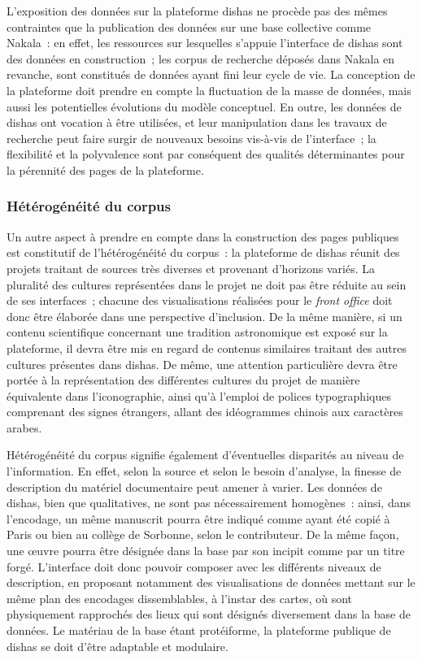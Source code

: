 \documentclass[a4paper,12pt,twoside]{book}
\newcommand{\eng}{\emph}
\newcommand{\bdd}{base de données\xspace}
\newcommand{\dishas}{\gls{dishas}\xspace}
\begin{document}
L'exposition des données sur la plateforme \dishas ne procède pas des mêmes contraintes que la publication des données sur une base collective comme Nakala~: en effet, les ressources sur lesquelles s'appuie l'interface de \dishas sont des données en construction~; les corpus de recherche déposés dans Nakala en revanche, sont constitués de données ayant fini leur cycle de vie. La conception de la plateforme doit prendre en compte la fluctuation de la masse de données, mais aussi les potentielles évolutions du modèle conceptuel. En outre, les données de \dishas ont vocation à être utilisées, et leur manipulation dans les travaux de recherche peut faire surgir de nouveaux besoins vis-à-vis de l'interface~; la flexibilité et la polyvalence sont par conséquent des qualités déterminantes pour la pérennité des pages de la plateforme.

			\subsubsection{Hétérogénéité du corpus}
Un autre aspect à prendre en compte dans la construction des pages publiques est constitutif de l'hétérogénéité du corpus~: la plateforme de \dishas réunit des projets traitant de sources très diverses et provenant d'horizons variés. La pluralité des cultures représentées dans le projet ne doit pas être réduite au sein de ses interfaces~; chacune des visualisations réalisées pour le \eng{front office} doit donc être élaborée dans une perspective d'inclusion. De la même manière, si un contenu scientifique concernant une tradition astronomique est exposé sur la plateforme, il devra être mis en regard de contenus similaires traitant des autres cultures présentes dans \dishas. De même, une attention particulière devra être portée à la représentation des différentes cultures du projet de manière équivalente dans l'iconographie, ainsi qu'à l'emploi de polices typographiques comprenant des signes étrangers, allant des idéogrammes chinois aux caractères arabes.

Hétérogénéité du corpus signifie également d'éventuelles disparités au niveau de l'information. En effet, selon la source et selon le besoin d'analyse, la finesse de description du matériel documentaire peut amener à varier. Les données de \dishas, bien que qualitatives, ne sont pas nécessairement homogènes~: ainsi, dans l'encodage, un même manuscrit pourra être indiqué comme ayant été copié à Paris ou bien au collège de Sorbonne, selon le contributeur. De la même façon, une œuvre pourra être désignée dans la base par son incipit comme par un titre forgé. L'interface doit donc pouvoir composer avec les différents niveaux de description, en proposant notamment des visualisations de données mettant sur le même plan des encodages dissemblables, à l'instar des cartes, où sont physiquement rapprochés des lieux qui sont désignés diversement dans la \bdd. Le matériau de la base étant protéiforme, la plateforme publique de \dishas se doit d'être adaptable et modulaire.
\end{document}
